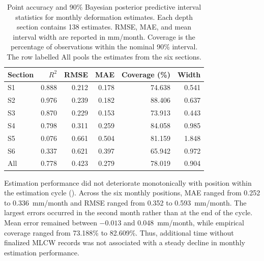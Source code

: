 \begin{table}[htbp]
  \centering
  \small
  \renewcommand{\arraystretch}{1.15}
  \caption[Performance and posterior predictive interval statistics during delayed MLCW delivery.]{Point accuracy and 90\% Bayesian posterior predictive interval statistics for monthly deformation estimates. Each depth section contains 138 estimates. RMSE, MAE, and mean interval width are reported in mm/month. Coverage is the percentage of observations within the nominal 90\% interval. The row labelled All pools the estimates from the six sections.}
  \label{tab:delayed_performance_interval}
  \begin{tabular}{lrrrrr}
    \toprule
    \textbf{Section} & \textbf{$R^2$} & \textbf{RMSE} & \textbf{MAE} & \textbf{Coverage (\%)} & \textbf{Width} \\
    \midrule
    S1 & 0.888 & 0.212 & 0.178 & 74.638 & 0.541 \\
    S2 & 0.976 & 0.239 & 0.182 & 88.406 & 0.637 \\
    S3 & 0.870 & 0.229 & 0.153 & 73.913 & 0.443 \\
    S4 & 0.798 & 0.311 & 0.259 & 84.058 & 0.985 \\
    S5 & 0.076 & 0.661 & 0.504 & 81.159 & 1.848 \\
    S6 & 0.337 & 0.621 & 0.397 & 65.942 & 0.972 \\
    \midrule
    All & 0.778 & 0.423 & 0.279 & 78.019 & 0.904 \\
    \bottomrule
  \end{tabular}
\end{table}

Estimation performance did not deteriorate monotonically with position within the estimation cycle (). Across the six monthly positions, MAE ranged from 0.252 to 0.336~mm/month and RMSE ranged from 0.352 to 0.593~mm/month. The largest errors occurred in the second month rather than at the end of the cycle. Mean error remained between $-0.013$ and 0.048~mm/month, while empirical coverage ranged from 73.188\% to 82.609\%. Thus, additional time without finalized MLCW records was not associated with a steady decline in monthly estimation performance.

